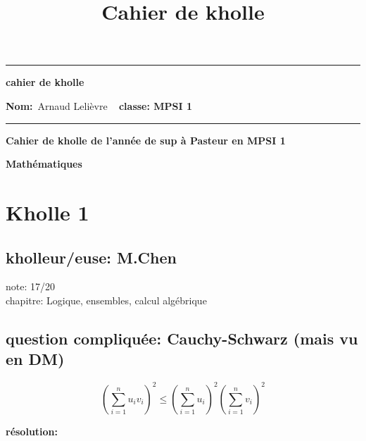 \documentclass{article}
\title{Cahier de kholle}
\begin{document}
\begin{center}
  \hrule
	\vspace{.4cm}
	{\textbf{\large cahier de kholle}}
\end{center}

{\textbf{Nom:}\ Arnaud Lelièvre \hspace{\fill} \vspace{0.5cm}}
{\textbf{}\  \hspace{\fill} \vspace{0.5cm}}
{\textbf{classe: MPSI 1}\ \hspace{\fill}}
\hrule
\date{}

\vspace{1cm}

\begin{center}
\textbf{\large Cahier de kholle de l'année de sup à Pasteur en MPSI 1}
\end{center} \vspace{0.2cm}

\begin{center}
\textbf{\large Mathématiques}
\end{center} \vspace{0.2cm}

\section{Kholle 1}
\subsection{kholleur/euse: M.Chen}

note: 17/20 \\
chapitre: Logique, ensembles, calcul algébrique\\

\subsection{question compliquée: Cauchy-Schwarz (mais vu en DM)}

\vspace{5mm}

\begin{equation}
  \left(\sum_{i=1}^{n} u_i v_i \right)^2 \leqslant \left(\sum_{i=1}^{n} u_i\right)^2 \left(\sum_{i=1}^{n} v_i \right)^2
\end{equation}

\textbf{\large résolution:}
\vspace{5mm}
\end{document}
